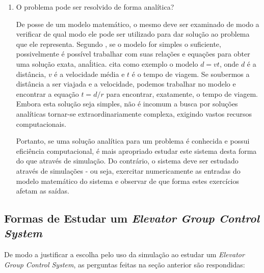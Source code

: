 \begin{enumerate}
\item O problema pode ser resolvido de forma analítica?

De posse de um modelo matemático, o mesmo deve ser examinado de modo a verificar
de qual modo ele pode ser utilizado para dar solução ao problema que ele
representa. Segundo \cite{Law}, se o modelo for simples o suficiente,
possivelmente é possível trabalhar com suas relações e equações para obter uma
solução exata, anaĺitica. \cite{Law} cita como exemplo o modelo $d = vt$, onde
$d$ é a distância, $v$ é a velocidade média e $t$ é o tempo de viagem. Se
soubermos a distância a ser viajada e a velocidade, podemos trabalhar no modelo
e encontrar a equação $t = d/r$ para encontrar, exatamente, o tempo de viagem.
Embora esta solução seja simples, não é incomum a busca por soluções analíticas
tornar-se extraordinariamente complexa, exigindo vastos recursos computacionais.

Portanto, se uma solução analítica para um problema é conhecida e possui
eficiência computacional, é mais apropriado estudar este sistema desta forma do
que através de simulação. Do contrário, o sistema deve ser estudado através de
simulações - ou seja, exercitar numericamente as entradas do modelo matemático
do sistema e observar de que forma estes exercícios afetam as saídas.
\end{enumerate}

\subsection{Formas de Estudar um \textit{Elevator Group Control System}}

De modo a justificar a escolha pelo uso da simulação ao estudar um
\textit{Elevator Group Control System}, as perguntas feitas na seção anterior
são respondidas:

